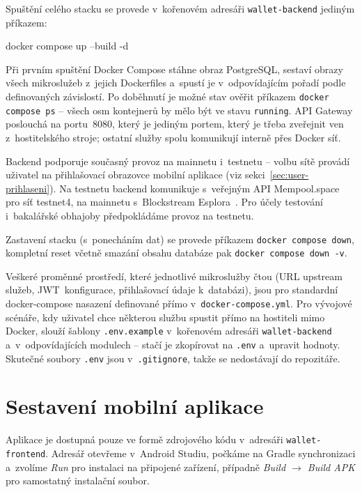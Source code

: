 Spuštění celého stacku se provede v~kořenovém adresáři \texttt{wallet-backend}
jediným příkazem:

\begin{code}
docker compose up --build -d
\end{code}

Při prvním spuštění Docker Compose stáhne obraz PostgreSQL, sestaví obrazy
všech mikroslužeb z~jejich Dockerfiles a~spustí je v~odpovídajícím pořadí
podle definovaných závislostí. Po doběhnutí je možné stav ověřit
příkazem \texttt{docker compose ps} -- všech osm kontejnerů by mělo být ve
stavu \texttt{running}. API Gateway poslouchá na portu~8080, který je
jediným portem, který je třeba zveřejnit ven z~hostitelského stroje;
ostatní služby spolu komunikují interně přes Docker síť.

Backend podporuje současný provoz na mainnetu i~testnetu -- volbu sítě
provádí uživatel na přihlašovací obrazovce mobilní aplikace
(viz sekci~\ref{sec:user-prihlaseni}). Na testnetu backend komunikuje
s~veřejným API Mempool.space~\cite{MempoolAPI} pro síť testnet4, na
mainnetu s~Blockstream Esplora~\cite{BlockstreamEsplora}. Pro účely
testování i~bakalářské obhajoby předpokládáme provoz na testnetu.

Zastavení stacku (s~ponecháním dat) se provede příkazem
\texttt{docker compose down}, kompletní reset včetně smazání obsahu
databáze pak \texttt{docker compose down -v}.

Veškeré proměnné prostředí, které jednotlivé mikroslužby čtou
(URL upstream služeb, JWT~konfigurace, přihlašovací údaje k~databázi),
jsou pro standardní docker-compose nasazení definované přímo
v~\texttt{docker-compose.yml}. Pro vývojové scénáře, kdy uživatel
chce některou službu spustit přímo na hostiteli mimo Docker, slouží
šablony \texttt{.env.example} v~kořenovém adresáři \texttt{wallet-backend}
a~v~odpovídajících modulech -- stačí je zkopírovat na \texttt{.env}
a~upravit hodnoty. Skutečné soubory \texttt{.env} jsou v~\texttt{.gitignore},
takže se nedostávají do repozitáře.

\section{Sestavení mobilní aplikace}
\label{sec:user-app}

Aplikace je dostupná pouze ve formě zdrojového kódu v~adresáři
\texttt{wallet-frontend}. Adresář otevřeme v~Android Studiu, počkáme
na Gradle synchronizaci a~zvolíme \emph{Run} pro instalaci na připojené
zařízení, případně \emph{Build $\to$ Build APK} pro samostatný
instalační soubor.

